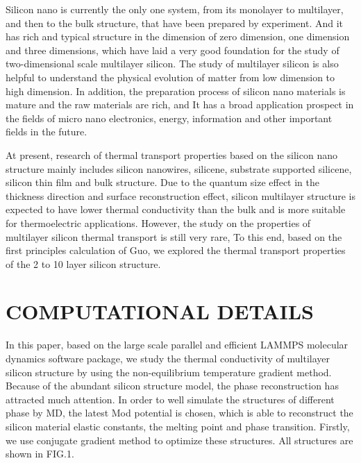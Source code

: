 \documentclass[%
 reprint,
 amsmath,amssymb,
 aps,
 prb,
]{revtex4-1}
\begin{document}
Silicon nano is currently the only one system, from its monolayer to multilayer, and then to the bulk structure, that have been prepared by experiment. And it has rich and typical structure in the dimension of zero dimension, one dimension and three dimensions, which have laid a very good foundation for the study of two-dimensional scale multilayer silicon. The study of multilayer silicon is also helpful to understand the physical evolution of matter from low dimension to high dimension. In addition, the preparation process of silicon nano materials is mature and the raw materials are rich, and It has a broad application prospect in the fields of micro nano electronics, energy, information and other important fields in the future.

At present, research of thermal transport properties based on the silicon nano structure mainly includes silicon nanowires\cite{Hochbaum2008,Yang2010,Shi2009,Boukai2008}, silicene\cite{Pei2013,Ng2013,Xie2014,Zhang2014,Liu2014}, substrate supported silicene\cite{Wang2015,Zhang2015a}, silicon thin film and bulk structure\cite{Bodapati2006,Tang2013Thermal,Jeong2012Thermal,Liu2006Thermal,Wang2006Lattice}. Due to the quantum size effect in the thickness direction and surface reconstruction effect, silicon multilayer structure is expected to have lower thermal conductivity than the bulk and is more suitable for thermoelectric applications. However, the study on the properties of multilayer silicon thermal transport is still very rare, To this end, based on the first principles calculation of Guo\cite{Guo2015Structural}, we explored the thermal transport properties of the 2 to 10 layer silicon structure.

\section{COMPUTATIONAL DETAILS}

In this paper, based on the large scale parallel and efficient LAMMPS molecular dynamics software package, we study the thermal conductivity of multilayer silicon structure by using the non-equilibrium temperature gradient method. Because of the abundant silicon structure model, the phase reconstruction has attracted much attention. In order to well simulate the structures of different phase by MD, the latest Mod potential is chosen\cite{Kumagai2007Development}, which is able to reconstruct the silicon material elastic constants, the melting point and phase transition. Firstly, we use conjugate gradient method to optimize these structures. All structures are shown in FIG.1.
\end{document}
